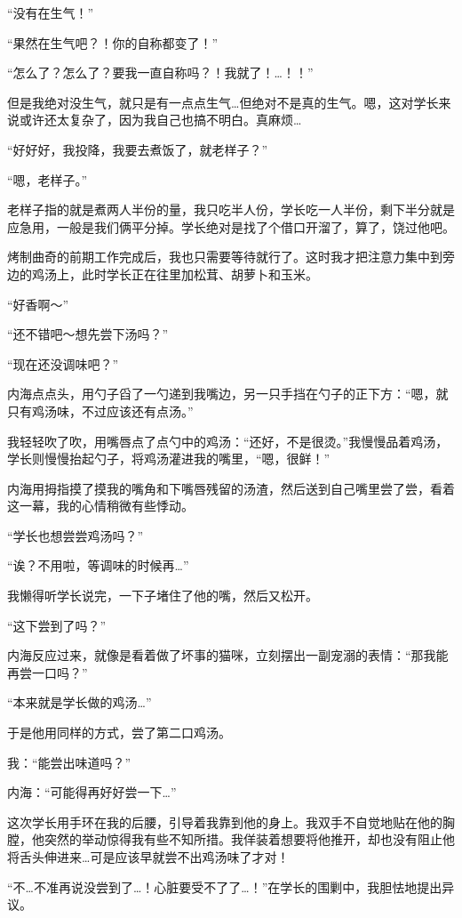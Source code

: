 “没有在生气！”

“果然在生气吧？！你的自称都变了！”

“怎么了？怎么了？要我一直自称吗？！我就了！…！！”

但是我绝对没生气，就只是有一点点生气…但绝对不是真的生气。嗯，这对学长来说或许还太复杂了，因为我自己也搞不明白。真麻烦…

“好好好，我投降，我要去煮饭了，就老样子？”

“嗯，老样子。”

老样子指的就是煮两人半份的量，我只吃半人份，学长吃一人半份，剩下半分就是应急用，一般是我们俩平分掉。学长绝对是找了个借口开溜了，算了，饶过他吧。

烤制曲奇的前期工作完成后，我也只需要等待就行了。这时我才把注意力集中到旁边的鸡汤上，此时学长正在往里加松茸、胡萝卜和玉米。

“好香啊～”

“还不错吧～想先尝下汤吗？”

“现在还没调味吧？”

内海点点头，用勺子舀了一勺递到我嘴边，另一只手挡在勺子的正下方：“嗯，就只有鸡汤味，不过应该还有点汤。”

我轻轻吹了吹，用嘴唇点了点勺中的鸡汤：“还好，不是很烫。”我慢慢品着鸡汤，学长则慢慢抬起勺子，将鸡汤灌进我的嘴里，“嗯，很鲜！”

内海用拇指摸了摸我的嘴角和下嘴唇残留的汤渣，然后送到自己嘴里尝了尝，看着这一幕，我的心情稍微有些悸动。

“学长也想尝尝鸡汤吗？”

“诶？不用啦，等调味的时候再…”

我懒得听学长说完，一下子堵住了他的嘴，然后又松开。

“这下尝到了吗？”

内海反应过来，就像是看着做了坏事的猫咪，立刻摆出一副宠溺的表情：“那我能再尝一口吗？”

“本来就是学长做的鸡汤…”

于是他用同样的方式，尝了第二口鸡汤。

我：“能尝出味道吗？”

内海：“可能得再好好尝一下…”

这次学长用手环在我的后腰，引导着我靠到他的身上。我双手不自觉地贴在他的胸膛，他突然的举动惊得我有些不知所措。我佯装着想要将他推开，却也没有阻止他将舌头伸进来…可是应该早就尝不出鸡汤味了才对！

“不…不准再说没尝到了…！心脏要受不了了…！”在学长的围剿中，我胆怯地提出异议。

